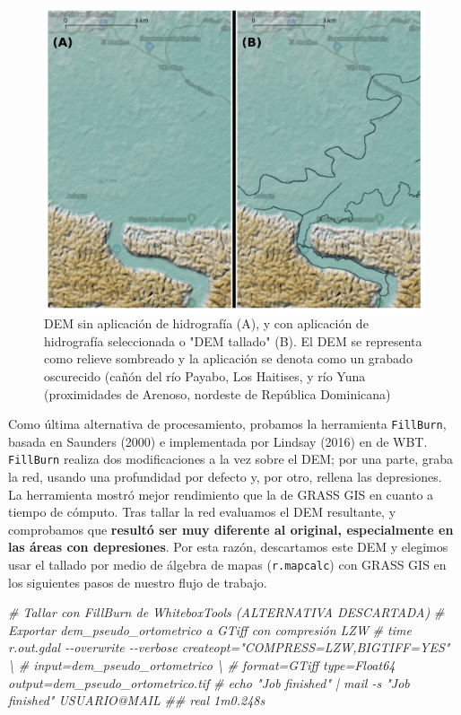 \documentclass[spanish]{article}
\newenvironment{Shaded}{\begin{snugshade}}{\end{snugshade}}
\newcommand{\CommentTok}[1]{\textcolor[rgb]{0.56,0.35,0.01}{\textit{#1}}}
\begin{document}
\begin{figure}

{\centering \includegraphics[width=1\linewidth]{figuras/dem-sin-tallar-tallado} 

}

\caption{DEM sin aplicación de hidrografía (A), y con aplicación de hidrografía seleccionada o "DEM tallado" (B). El DEM se representa como relieve sombreado y la aplicación se denota como un grabado oscurecido (cañón del río Payabo, Los Haitises, y río Yuna (proximidades de Arenoso, nordeste de República Dominicana)}\label{fig:demtallado}
\end{figure}

Como última alternativa de procesamiento, probamos la herramienta
\texttt{FillBurn}, basada en Saunders (2000) e implementada por Lindsay
(2016) en de WBT. \texttt{FillBurn} realiza dos modificaciones a la vez
sobre el DEM; por una parte, graba la red, usando una profundidad por
defecto y, por otro, rellena las depresiones. La herramienta mostró
mejor rendimiento que la de GRASS GIS en cuanto a tiempo de cómputo.
Tras tallar la red evaluamos el DEM resultante, y comprobamos que
\textbf{resultó ser muy diferente al original, especialmente en las
áreas con depresiones}. Por esta razón, descartamos este DEM y elegimos
usar el tallado por medio de álgebra de mapas (\texttt{r.mapcalc}) con
GRASS GIS en los siguientes pasos de nuestro flujo de trabajo.

\begin{Shaded}
\begin{Highlighting}[]
\CommentTok{\# Tallar con FillBurn de WhiteboxTools  (ALTERNATIVA DESCARTADA)}
\CommentTok{\# Exportar dem\_pseudo\_ortometrico a GTiff con compresión LZW}
\CommentTok{\# time r.out.gdal {-}{-}overwrite {-}{-}verbose createopt="COMPRESS=LZW,BIGTIFF=YES" \textbackslash{}}
\CommentTok{\#  input=dem\_pseudo\_ortometrico \textbackslash{}}
\CommentTok{\#  format=GTiff type=Float64 output=dem\_pseudo\_ortometrico.tif}
\CommentTok{\# echo "Job finished" | mail {-}s "Job finished" USUARIO@MAIL}
\CommentTok{\#\# real 1m0.248s}
\end{Highlighting}
\end{Shaded}
\end{document}
